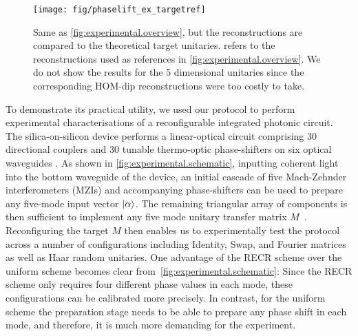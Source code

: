 \begin{figure}[tbp]
  \centering
  \texttt{[image: fig/phaselift\_ex\_targetref]}
  \caption{%
     \label{fig:experimental.targetref}
     Same as \cref{fig:experimental.overview}, but the reconstructions are compared to the theoretical target unitaries.
      refers to the reconstructions used as references in \cref{fig:experimental.overview}.
     We do not show the results for the 5 dimensional unitaries since the corresponding HOM-dip reconstructions were too costly to take.
  }
\end{figure}

To demonstrate its practical utility, we used our protocol to perform experimental characterisations of a reconfigurable integrated photonic circuit.
The silica-on-silicon device performs a linear-optical circuit comprising 30 directional couplers and 30 tunable thermo-optic phase-shifters on six optical waveguides \cite{Carolan2015}.
As shown in \cref{fig:experimental.schematic}, inputting coherent light into the bottom waveguide of the device, an initial cascade of five Mach-Zehnder interferometers (MZIs) and accompanying phase-shifters can be used to prepare any five-mode input vector $\ket{{\alpha}}$.
The remaining triangular array of components is then sufficient to implement any five mode unitary transfer matrix $M$~\cite{Reck1994}.
Reconfiguring the target $M$ then enables us to experimentally test the protocol across a number of configurations including Identity, Swap, and Fourier matrices as well as Haar random unitaries.
One advantage of the RECR scheme over the uniform scheme becomes clear from~\cref{fig:experimental.schematic}:
Since the RECR scheme only requires four different phase values in each mode, these configurations can be calibrated more precisely.
In contrast, for the uniform scheme the preparation stage needs to be able to prepare any phase shift in each mode, and therefore, it is much more demanding for the experiment.

